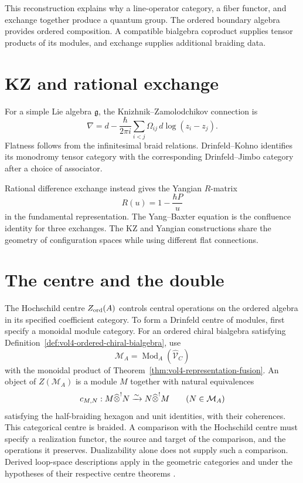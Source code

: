 This reconstruction explains why a line-operator category, a fiber functor, and exchange together produce a quantum group. The ordered boundary algebra provides ordered composition.  A compatible bialgebra coproduct supplies tensor products of its modules, and exchange supplies additional braiding data.

\chapter{KZ and rational exchange}
For a simple Lie algebra $\mathfrak g$, the Knizhnik--Zamolodchikov connection is
\[
 \nabla=d-\frac{\hbar}{2\pi i}
 \sum_{i<j}\Omega_{ij}\,d\log(z_i-z_j).
\]
Flatness follows from the infinitesimal braid relations. Drinfeld--Kohno identifies its monodromy tensor category with the corresponding Drinfeld--Jimbo category after a choice of associator.

Rational difference exchange instead gives the Yangian $R$-matrix
\[
 R(u)=1-\frac{\hbar P}{u}
\]
in the fundamental representation. The Yang--Baxter equation is the confluence identity for three exchanges. The KZ and Yangian constructions share the geometry of configuration spaces while using different flat connections.

\chapter{The centre and the double}
The Hochschild centre $Z_{\mathrm{ord}}(A)$ controls central operations on the
ordered algebra in its specified coefficient category.
To form a Drinfeld centre of modules, first specify a monoidal module category.
For an ordered chiral bialgebra satisfying
Definition~\ref{def:vol4-ordered-chiral-bialgebra}, use
\[
 \mathcal M_A=\operatorname{Mod}_A(\widehat{\mathcal V}_C)
\]
with the monoidal product of Theorem~\ref{thm:vol4-representation-fusion}.
An object of $Z(\mathcal M_A)$ is a module $M$ together with natural equivalences
\[
 c_{M,N}:M\widehat{\mathbin{\otimes}}^{!}N
 \xrightarrow{\sim}N\widehat{\mathbin{\otimes}}^{!}M
 \qquad(N\in\mathcal M_A)
\]
satisfying the half-braiding hexagon and unit identities, with their coherences.
This categorical centre is braided.
A comparison with the Hochschild centre must specify a realization functor,
the source and target of the comparison, and the operations it preserves.
Dualizability alone does not supply such a comparison.
Derived loop-space descriptions apply in the geometric categories and
under the hypotheses of their respective centre theorems
\cite{BenZviFrancisNadler}.

